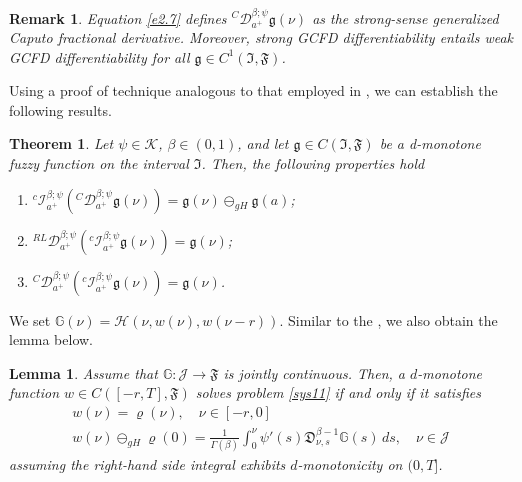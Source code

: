 \documentclass[10pt,a4paper]{amsart}
\numberwithin{equation}{section}
\newtheorem{theorem}[theo]{Theorem}
\newtheorem{lemma}[theo]{Lemma}
\newtheorem{remark}[theo]{Remark}
\begin{document}
\begin{remark} \label{rmk2.2} \rm
Equation \eqref{e2.7} defines \(^C \mathcal{D}_{a^{+}}^{\beta ; \psi} \mathfrak{g}(\nu )\)
as the strong-sense generalized Caputo fractional derivative. 
Moreover, strong GCFD differentiability entails weak GCFD differentiability for all 
\(\mathfrak{g} \in C^1(\mathfrak{I}, \mathfrak{F})\).
\end{remark}

Using a proof of technique analogous to that employed in 
\cite[Prop. 1 and Corollary 1]{hoa2018}, we can establish the following results.

\begin{theorem}\label{thm2}
Let \(\psi \in \mathcal{K}\), \(\beta \in (0,1)\), and let 
\(\mathfrak{g} \in C(\mathfrak{I}, \mathfrak{F})\) be a d-monotone fuzzy function on 
the interval \(\mathfrak{I}\). Then, the following properties hold
\begin{enumerate}
\item ${}^{c} \mathcal{I}_{a^{+}}^{\beta ; \psi} ( {}^C \mathcal{D}_{a^{+}}^{\beta ; 
\psi} \mathfrak{g}(\nu ) ) = \mathfrak{g}(\nu ) \ominus_{gH} \mathfrak{g}(a)$;

\item ${}^{RL} \mathcal{D}_{a^{+}}^{\beta ; \psi} ( {}^{c} 
\mathcal{I}_{a^{+}}^{\beta ; \psi} \mathfrak{g}(\nu ) ) = \mathfrak{g}(\nu )$;

\item ${}^C \mathcal{D}_{a^{+}}^{\beta ; \psi} ( {}^{c} \mathcal{I}_{a^{+}}^{\beta ; 
\psi} \mathfrak{g}(\nu ) ) = \mathfrak{g}(\nu )$.
\end{enumerate}
\end{theorem}

We set $\mathbb{G}(\nu )=\mathcal{H}(\nu , w(\nu ), w(\nu - r ))$. Similar to the 
\cite[Theorem 3]{hoa2018}, we also obtain the lemma below.

\begin{lemma}\label{lem1}
Assume that \(\mathbb{G} : \mathcal{J} \to \mathfrak{F}\) is jointly continuous. 
Then, a \(d\)-monotone function \( w \in C([- r, T], \mathfrak{F})\) solves problem 
\eqref{sys11} if and only if it satisfies
\begin{equation} \label{sys28}
\begin{gathered}
 w(\nu )=\varrho(\nu ), \quad \nu \in[- r, 0]  \\
 w(\nu ) \ominus_{g H} \varrho(0)=\frac{1}{\Gamma(\beta)} \int_0^{\nu }
 \psi'(s)\mathfrak{D}_{\nu ,s}^{\beta-1} \mathbb{G}(s)\,ds, \quad \nu \in\mathcal{J}
\end{gathered}
\end{equation}
assuming the right-hand side integral exhibits \(d\)-monotonicity on \((0, T]\).
\end{lemma}
\end{document}
